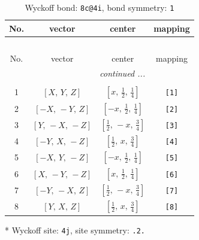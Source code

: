 \documentclass[fleqn,8pt]{jsarticle}
\begin{document}
\renewcommand{\arraystretch}{1.2}
\begin{longtable}{cccc}
\caption{Wyckoff bond: {\tt 8c@4i}, bond symmetry: {\tt 1}}
 \\
 \hline \hline
No. & vector & center & mapping \\ \hline \endfirsthead

\multicolumn{3}{l}{\tablename\ \thetable{}} \\
 \hline \hline
No. & vector & center & mapping \\ \hline \endhead

 \hline \hline
\multicolumn{3}{r}{\footnotesize\it continued ...} \\ \endfoot

 \hline \hline
\multicolumn{3}{r}{} \\ \endlastfoot

1 & $\left[ X,\, Y,\, Z \right]$ & $\left[ x,\, \frac{1}{2},\, \frac{1}{4} \right]$ & {\tt [1]} \\ \hline
2 & $\left[ - X,\, - Y,\, Z \right]$ & $\left[ - x,\, \frac{1}{2},\, \frac{1}{4} \right]$ & {\tt [2]} \\ \hline
3 & $\left[ Y,\, - X,\, - Z \right]$ & $\left[ \frac{1}{2},\, - x,\, \frac{3}{4} \right]$ & {\tt [3]} \\ \hline
4 & $\left[ - Y,\, X,\, - Z \right]$ & $\left[ \frac{1}{2},\, x,\, \frac{3}{4} \right]$ & {\tt [4]} \\ \hline
5 & $\left[ - X,\, Y,\, - Z \right]$ & $\left[ - x,\, \frac{1}{2},\, \frac{1}{4} \right]$ & {\tt [5]} \\ \hline
6 & $\left[ X,\, - Y,\, - Z \right]$ & $\left[ x,\, \frac{1}{2},\, \frac{1}{4} \right]$ & {\tt [6]} \\ \hline
7 & $\left[ - Y,\, - X,\, Z \right]$ & $\left[ \frac{1}{2},\, - x,\, \frac{3}{4} \right]$ & {\tt [7]} \\ \hline
8 & $\left[ Y,\, X,\, Z \right]$ & $\left[ \frac{1}{2},\, x,\, \frac{3}{4} \right]$ & {\tt [8]} \\
\end{longtable}
* Wyckoff site: {\tt 4j}, site symmetry: {\tt .2.}
\renewcommand{\arraystretch}{1.2}
\end{document}
